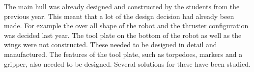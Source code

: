 The main hull was already designed and constructed by the students from the previous year. This meant that a lot of the design decision had already been made. For example the over all shape of the robot and the thruster configuration was decided last year. The tool plate on the bottom of the robot as well as the wings were not constructed. These needed to be designed in detail and manufactured. The features of the tool plate, such as torpedoes, markers and a gripper, also needed to be designed. Several solutions for these have been studied. 